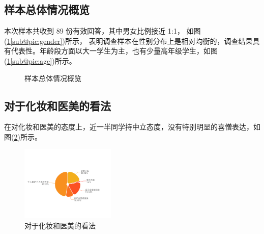 \subsection{样本总体情况概览}
本次样本共收到 89 份有效回答，其中男女比例接近 1:1，
如图(\ref{pic:overall}\ref{sub@pic:gender})所示，
表明调查样本在性别分布上是相对均衡的，调查结果具有代表性。年龄段方面以大一学生为主，也有少量高年级学生，如图(\ref{pic:overall}\ref{sub@pic:age})所示。
\begin{figure}[H]
    \centering
    \caption{样本总体情况概览}
    \label{pic:overall}
\end{figure}

\subsection{对于化妆和医美的看法}
在对化妆和医美的态度上，近一半同学持中立态度，没有特别明显的喜憎表达，如图(\ref{pic:yimei})所示。
\begin{figure}[H]
    \centering
    \includegraphics[width=0.4\textwidth]{./pic/对于化妆和医美的看法.jpg}
    \caption{对于化妆和医美的看法}
    \label{pic:yimei}
\end{figure}
